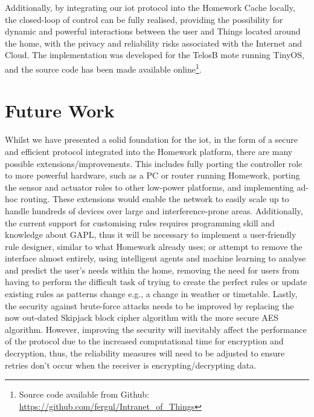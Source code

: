 \documentclass{mpaper}
\begin{document}
Additionally, by integrating our iot protocol into the Homework Cache locally, the closed-loop of control can be fully realised, providing the possibility for dynamic and powerful interactions between the user and Things located around the home, with the privacy and reliability risks associated with the Internet and Cloud. The implementation was developed for the TelosB mote running TinyOS, and the source code has been made available online\footnote{Source code available from Github: \url{https://github.com/fergul/Intranet_of_Things}}.

\section{Future Work} %
\label{sec:future_work}
Whilst we have presented a solid foundation for the iot, in the form of a secure and efficient protocol integrated into the Homework platform, there are many possible extensions/improvements. This includes fully porting the controller role to more powerful hardware, such as a PC or router running Homework, porting the sensor and actuator roles to other low-power platforms, and implementing ad-hoc routing. These extensions would enable the network to easily scale up to handle hundreds of devices over large and interference-prone areas. Additionally, the current support for customising rules requires programming skill and knowledge about GAPL, thus it will be necessary to implement a user-friendly rule designer, similar to what Homework already uses\cite{HomeworkInterface}; or attempt to remove the interface almost entirely, using intelligent agents and machine learning to analyse and predict the user's needs within the home\cite{SmartHomeFusion,mavhome}, removing the need for users from having to perform the difficult task of trying to create the perfect rules or update existing rules as patterns change e.g., a change in weather or timetable. Lastly, the security against brute-force attacks needs to be improved by replacing the now out-dated Skipjack block cipher algorithm with the more secure AES algorithm\cite{NIST}. However, improving the security will inevitably affect the performance of the protocol due to the increased computational time for encryption and decryption, thus, the reliability measures will need to be adjusted to ensure retries don't occur when the receiver is encrypting/decrypting data.


\end{document}
